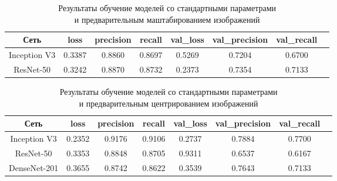 \begin{table}[H]
    \centering
    \caption{Результаты обучение моделей со стандартными параметрами \\и предварительным маштабированием изображений} \label{rescale}
    \begin{tabular}{|c|c|c|c|c|c|c|c|}
        \hline    
        Сеть          & loss   & precision & recall & val\_loss & val\_precision & val\_recall \\ %
        \hline
        Inception V3  & 0.3387 & 0.8860    & 0.8697 & 0.5269    & 0.7204         & 0.6700 \\ %
        \hline
        ResNet-50     & 0.3242 & 0.8870    & 0.8732 & 0.2373    & 0.7354         & 0.7133 \\ %
        \hline
        \hline
      \end{tabular}
\end{table}

\begin{table}[H]
    \centering
    \caption{Результаты обучение моделей со стандартными параметрами \\и предварительным центрированием изображений} \label{samplewise}    
    \begin{tabular}{|c|c|c|c|c|c|c|c|}
        \hline    
        Сеть          & loss   & precision & recall & val\_loss & val\_precision & val\_recall \\ %
        \hline
        Inception V3  & 0.2352 & 0.9176    & 0.9106 & 0.2737   & 0.7884        & 0.7700 \\ %
        \hline
        ResNet-50     & 0.3353  & 0.8848   & 0.8705 & 0.9311   & 0.6537        & 0.6167 \\ %
        \hline
        DenseNet-201  & 0.3655  & 0.8742   & 0.8622 & 0.3539   & 0.7643        & 0.7133 \\ %
        \hline
      \end{tabular}
\end{table}